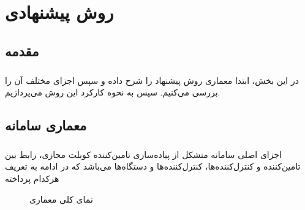 
\chapter{روش پیشنهادی} \label{ch:method}
\thispagestyle{empty}

\section{مقدمه}
\paragraph{}{
    در این بخش، ابتدا معماری روش پیشنهاد را شرح داده و سپس اجزای مختلف آن را بررسی می‌کنیم. سپس به نحوه کارکرد این روش می‌پردازیم.
}

\section{معماری سامانه}
\label{sec:system_arch}
\paragraph{}{
    اجزای اصلی سامانه متشکل از پیاده‌سازی تامین‌کننده کوبلت مجازی، رابط بین تامین‌کننده و کنترل‌کننده‌ها، کنترل‌کننده‌ها و دستگاه‌ها می‌باشد که در ادامه به تعریف هرکدام پرداخته
    \begin{figure}[H]
        \caption{نمای کلی معماری}
        \label{fig:arch}
    \end{figure}
}
